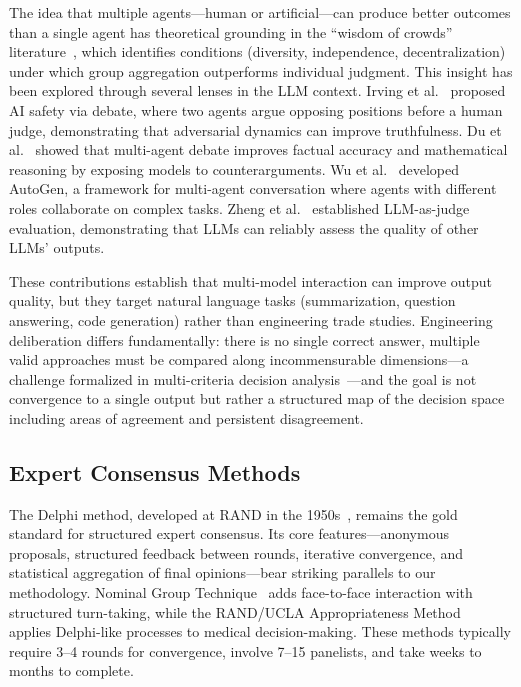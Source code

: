\documentclass[11pt,a4paper]{article}
\begin{document}
The idea that multiple agents---human or artificial---can produce better outcomes than a single agent has theoretical grounding in the ``wisdom of crowds'' literature~\cite{surowiecki2004wisdom}, which identifies conditions (diversity, independence, decentralization) under which group aggregation outperforms individual judgment. This insight has been explored through several lenses in the LLM context. Irving et al.~\cite{irving2018debate} proposed AI safety via debate, where two agents argue opposing positions before a human judge, demonstrating that adversarial dynamics can improve truthfulness. Du et al.~\cite{du2023debate} showed that multi-agent debate improves factual accuracy and mathematical reasoning by exposing models to counterarguments. Wu et al.~\cite{wu2023autogen} developed AutoGen, a framework for multi-agent conversation where agents with different roles collaborate on complex tasks. Zheng et al.~\cite{zheng2024judging} established LLM-as-judge evaluation, demonstrating that LLMs can reliably assess the quality of other LLMs' outputs.

These contributions establish that multi-model interaction can improve output quality, but they target natural language tasks (summarization, question answering, code generation) rather than engineering trade studies. Engineering deliberation differs fundamentally: there is no single correct answer, multiple valid approaches must be compared along incommensurable dimensions---a challenge formalized in multi-criteria decision analysis~\cite{keeney1976decisions}---and the goal is not convergence to a single output but rather a structured map of the decision space including areas of agreement and persistent disagreement.

\subsection{Expert Consensus Methods}

The Delphi method, developed at RAND in the 1950s~\cite{linstone1975delphi,dalkey1963experimental}, remains the gold standard for structured expert consensus. Its core features---anonymous proposals, structured feedback between rounds, iterative convergence, and statistical aggregation of final opinions---bear striking parallels to our methodology. Nominal Group Technique~\cite{delbecq1975group} adds face-to-face interaction with structured turn-taking, while the RAND/UCLA Appropriateness Method~\cite{fitch2001rand} applies Delphi-like processes to medical decision-making. These methods typically require 3--4 rounds for convergence, involve 7--15 panelists, and take weeks to months to complete.
\end{document}

